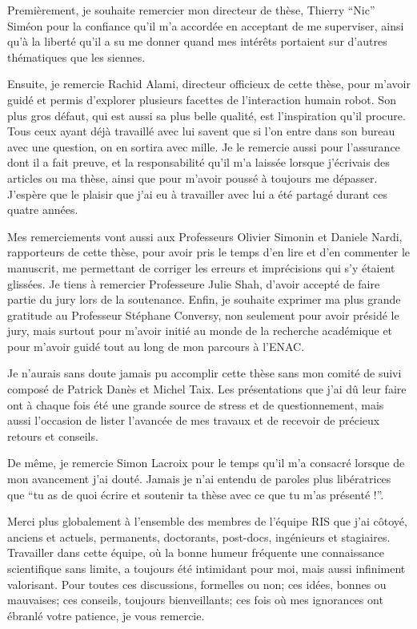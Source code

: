 \documentclass[english,a4paper,11pt,twoside]{StyleThese}
\begin{document}
Premièrement, je souhaite remercier mon directeur de thèse, Thierry ``Nic'' Siméon pour la confiance qu'il m'a accordée en acceptant de me superviser, ainsi qu'à la liberté qu'il a su me donner quand mes intérêts portaient sur d'autres thématiques que les siennes.

Ensuite, je remercie Rachid Alami, directeur officieux de cette thèse, pour m'avoir guidé et permis d'explorer plusieurs facettes de l'interaction humain robot. Son plus gros défaut, qui est aussi sa plus belle qualité, est l'inspiration qu'il procure. Tous ceux ayant déjà travaillé avec lui savent que si l'on entre dans son bureau avec une question, on en sortira avec mille. Je le remercie aussi pour l'assurance dont il a fait preuve, et la responsabilité qu'il m'a laissée lorsque j'écrivais des articles ou ma thèse, ainsi que pour m'avoir poussé à toujours me dépasser. J'espère que le plaisir que j'ai eu à travailler avec lui a été partagé durant ces quatre années.

Mes remerciements vont aussi aux Professeurs Olivier Simonin et Daniele Nardi, rapporteurs de cette thèse, pour avoir pris le temps d'en lire et d'en commenter le manuscrit, me permettant de corriger les erreurs et imprécisions qui s'y étaient glissées.
Je tiens à remercier Professeure Julie Shah, d'avoir accepté de faire partie du jury lors de la soutenance.
Enfin, je souhaite exprimer ma plus grande gratitude au Professeur Stéphane Conversy, non seulement pour avoir présidé le jury, mais surtout pour m'avoir initié au monde de la recherche académique et pour m'avoir guidé tout au long de mon parcours à l'ENAC.

Je n'aurais sans doute jamais pu accomplir cette thèse sans mon comité de suivi composé de Patrick Danès et Michel Taix. Les présentations que j'ai dû leur faire ont à chaque fois été une grande source de stress et de questionnement, mais aussi l'occasion de lister l'avancée de mes travaux et de recevoir de précieux retours et conseils.

De même, je remercie Simon Lacroix pour le temps qu'il m'a consacré lorsque de mon avancement j'ai douté. Jamais je n'ai entendu de paroles plus libératrices que ``tu as de quoi écrire et soutenir ta thèse avec ce que tu m'as présenté !''.

Merci plus globalement à l'ensemble des membres de l'équipe RIS que j'ai côtoyé, anciens et actuels, permanents, doctorants, post-docs, ingénieurs et stagiaires. Travailler dans cette équipe, où la bonne humeur fréquente une connaissance scientifique sans limite, a toujours été intimidant pour moi, mais aussi infiniment valorisant. Pour toutes ces discussions, formelles ou non; ces idées, bonnes ou mauvaises; ces conseils, toujours bienveillants; ces fois où mes ignorances ont ébranlé votre patience, je vous remercie.
\end{document}
